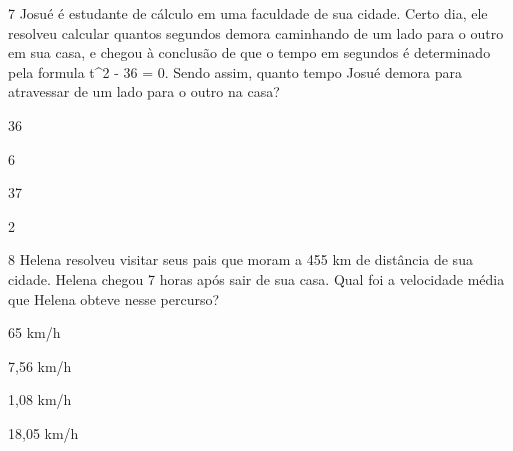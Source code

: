 



\num{7} Josué é estudante de cálculo em uma faculdade de sua cidade. Certo
dia, ele resolveu calcular quantos segundos demora caminhando de um lado
para o outro em sua casa, e chegou à conclusão de que o tempo em
segundos é determinado pela formula t^2 - 36 = 0. Sendo assim, quanto
tempo Josué demora para atravessar de um lado para o outro na casa?
\item 36
\item 6
\item 37
\item 2










\num{8} Helena resolveu visitar seus pais que moram a 455 km de distância de
sua cidade. Helena chegou 7 horas após sair de sua casa. Qual foi a
velocidade média que Helena obteve nesse percurso?
\item 65 km/h
\item 7,56 km/h
\item 1,08 km/h
\item 18,05 km/h


